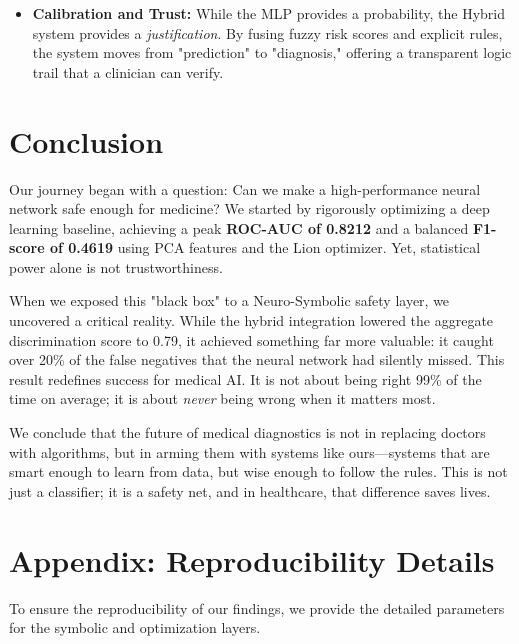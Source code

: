 \documentclass[conference]{IEEEtran}
\begin{document}
\begin{itemize}
    \item \textbf{Calibration and Trust:} While the MLP provides a probability, the Hybrid system provides a \textit{justification}. By fusing fuzzy risk scores and explicit rules, the system moves from "prediction" to "diagnosis," offering a transparent logic trail that a clinician can verify.
\end{itemize}

\section{Conclusion}
 Our journey began with a question: Can we make a high-performance neural network safe enough for medicine? We started by rigorously optimizing a deep learning baseline, achieving a peak \textbf{ROC-AUC of 0.8212} and a balanced \textbf{F1-score of 0.4619} using PCA features and the Lion optimizer. Yet, statistical power alone is not trustworthiness.

 When we exposed this "black box" to a Neuro-Symbolic safety layer, we uncovered a critical reality. While the hybrid integration lowered the aggregate discrimination score to 0.79, it achieved something far more valuable: it caught over 20\% of the false negatives that the neural network had silently missed. This result redefines success for medical AI. It is not about being right 99\% of the time on average; it is about \textit{never} being wrong when it matters most.

 We conclude that the future of medical diagnostics is not in replacing doctors with algorithms, but in arming them with systems like ours—systems that are smart enough to learn from data, but wise enough to follow the rules. This is not just a classifier; it is a safety net, and in healthcare, that difference saves lives.

\section*{Appendix: Reproducibility Details}
 To ensure the reproducibility of our findings, we provide the detailed parameters for the symbolic and optimization layers.
\end{document}
